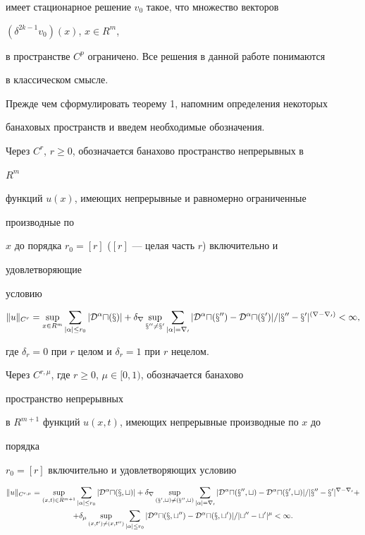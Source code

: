 имеет стационарное решение $v_0$ такое, что множество векторов 


$(\delta^{2k-1}v_0)(x)$, $x\in R^m$, 


в пространстве $C^p$ ограничено. Все решения в данной работе понимаются 


в классическом смысле. 


 


Прежде чем сформулировать теорему 1, напомним определения некоторых 


банаховых пространств и введем необходимые обозначения. 


 


Через $C^r$, $r\ge0$, обозначается банахово пространство непрерывных в 


$R^m$ 


функций $u(x)$, имеющих непрерывные и равномерно ограниченные 


производные по 


$x$ до порядка $r_0=[r]$ ($[r]$ --- целая часть $r$) включительно и 


удовлетворяющие 


условию 


$$ 


\|u\|_{C^r}=\sup_{x\in R^m}\sum_{|\alpha|\le r_0} 


|\cal D^\alpha u(x)|+\delta_r\sup_{x''\ne x'} 


\sum_{|\alpha|=r_0} 


|\cal D^\alpha u(x'')-\cal D^\alpha u(x')|/ 


|x''-x'|^{(r-r_0)}<\infty, 


$$ 


где $\delta_r=0$ при $r$ целом и $\delta_r=1$ при $r$ нецелом. 


 


Через $C^{r,\mu}$, где $r\ge0$, $\mu\in[0,1)$, обозначается банахово 


пространство непрерывных 


в $R^{m+1}$ функций $u(x,t)$, имеющих непрерывные производные по $x$ до 


порядка 


$r_0=[r]$ включительно и удовлетворяющих условию 


\begin{multline*} 


\|u\|_{C^{r,\mu}}=\sup_{(x,t)\in R^{m+1}} 


\sum_{|\alpha|\le r_0}|\cal D^\alpha u(x,t)|+ 


\delta_r\sup_{(x',t)\ne(x'',t)}\sum_{|\alpha|=r_0} 


|\cal D^\alpha u(x'',t)-\cal D^\alpha u(x',t)|/


|x''-x'|^{r-r_0}+\\ 


% 


+\delta_\mu\sup_{(x,t')\ne(x,t'')}\sum_{|\alpha|\le r_0} 


|\cal D^\alpha u(x,t'')- 


\cal D^\alpha u(x,t')|/|t''-t'|^\mu<\infty. 


\end{multline*} 


